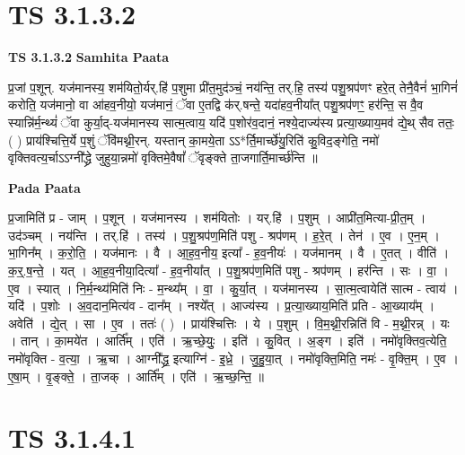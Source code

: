 \documentclass[17pt]{extarticle}
\begin{document}
\section*{ TS 3.1.3.2 }

\textbf{TS 3.1.3.2 } \newline
\textbf{Samhita Paata} \newline

प्र॒जां प॒शून्. यज॑मानस्य॒ शम॑यितो॒र्यर्.हि॑ प॒शुमा प्री॑त॒मुद॑ञ्चं॒ नय॑न्ति॒ तर्.हि॒ तस्य॑ पशु॒श्रप॑णꣳ हरे॒त् तेनै॒वैनं॑ भा॒गिनं॑ करोति॒ यज॑मानो॒ वा आ॑हव॒नीयो॒ यज॑मानं॒ ॅवा ए॒तद्वि क॑र्.षन्ते॒ यदा॑हव॒नीया᳚त् पशु॒श्रप॑णꣳ॒॒ हर॑न्ति॒ स वै॒व स्यान्नि॑र्म॒न्थ्यं॑ ॅवा कुर्या॒द्-यज॑मानस्य सात्म॒त्वाय॒ यदि॑ प॒शोर॑व॒दानं॒ नश्ये॒दाज्य॑स्य प्रत्या॒ख्याय॒मव॑ द्ये॒थ् सैव ततः॒ ( ) प्राय॑श्चित्ति॒र्ये प॒शुं ॅवि॑मथ्नी॒रन्. यस्तान् का॒मये॒ता ऽऽ*र्ति॒मार्च्छे॑यु॒रिति॑ कु॒विद॒ङ्गेति॒ नमो॑ वृक्तिवत्य॒र्चाऽऽग्नी᳚द्ध्रे जुहुया॒न्नमो॑ वृक्तिमे॒वैषां᳚ ॅवृङ्क्ते ता॒जगार्ति॒मार्च्छ॑न्ति ॥ \newline

\textbf{Pada Paata} \newline

प्र॒जामिति॑ प्र - जाम् । प॒शून् । यज॑मानस्य । शम॑यितोः । यर्.हि॑ । प॒शुम् । आप्री॑त॒मित्या-प्री॒त॒म् । उद॑ञ्चम् । नय॑न्ति । तर्.हि॑ । तस्य॑ । प॒शु॒श्रप॑ण॒मिति॑ पशु - श्रप॑णम् । ह॒रे॒त् । तेन॑ । ए॒व । ए॒न॒म् । भा॒गिन᳚म् । क॒रो॒ति॒ । यज॑मानः । वै । आ॒ह॒व॒नीय॒ इत्या᳚ - ह॒व॒नीयः॑ । यज॑मानम् । वै । ए॒तत् । वीति॑ । क॒र्॒.ष॒न्ते॒ । यत् । आ॒ह॒व॒नीया॒दित्या᳚ - ह॒व॒नीया᳚त् । प॒शु॒श्रप॑ण॒मिति॑ पशु - श्रप॑णम् । हर॑न्ति । सः । वा॒ । ए॒व । स्यात् । नि॒र्म॒न्थ्य॑मिति॑ निः - म॒न्थ्य᳚म् । वा॒ । कु॒र्या॒त् । यज॑मानस्य । सा॒त्म॒त्वायेति॑ सात्म - त्वाय॑ । यदि॑ । प॒शोः । अ॒व॒दान॒मित्य॑व - दान᳚म् । नश्ये᳚त् । आज्य॑स्य । प्र॒त्या॒ख्याय॒मिति॑ प्रति - आ॒ख्याय᳚म् । अवेति॑ । द्ये॒त् । सा । ए॒व । ततः॑ ( ) । प्राय॑श्चित्तिः । ये । प॒शुम् । वि॒म॒थ्नी॒रन्निति॑ वि - म॒थ्नी॒रन्न् । यः । तान् । का॒मये॑त । आर्ति᳚म् । एति॑ । ऋ॒च्छे॒युः॒ । इति॑ । कु॒वित् । अ॒ङ्ग । इति॑ । नमो॑वृक्तिव॒त्येति॒ नमो॑वृक्ति - व॒त्या॒ । ऋ॒चा । आग्नी᳚द्ध्र॒ इत्याग्नि॑ - इ॒ध्रे॒ । जु॒हु॒या॒त् । नमो॑वृक्ति॒मिति॒ नमः॑ - वृ॒क्ति॒म् । ए॒व । ए॒षा॒म् । वृ॒ङ्क्ते॒ । ता॒जक् । आर्ति᳚म् । एति॑ । ऋ॒च्छ॒न्ति॒ ॥  \newline




\section*{ TS 3.1.4.1 }
\end{document}
